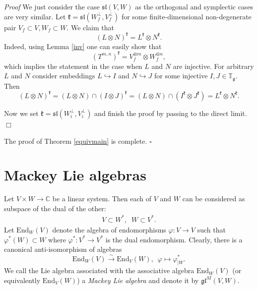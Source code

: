 \documentclass[10pt]{amsart}
\renewenvironment{proof}{ \emph{Proof}}{$\Box$}
\newcommand {\CC} {\mathbb {C}}
\newcommand{\TT}{\mathbb{T}}
\renewcommand{\sl}{\mathfrak{sl}}
\newcommand{\kk}{\mathfrak{k}}
\renewcommand{\gg}{\mathfrak{g}}
\renewcommand {\phi} {\varphi}
\newcommand{\gl}{\mathfrak{gl}}
\newcommand{\End}{\mathrm{End}}
\begin{document}
\begin{proof} We just consider the case $\sl(V,W)$ as the  orthogonal and symplectic cases are very similar.
Let $\kk=\sl(W_f^\perp,V_f^\perp)$ for some finite-dimensional
non-degenerate pair 
$V_f \subset V ,W_f \subset W$. We claim that 
$$(L\otimes N)^{\kk}=L^\kk\otimes N^\kk.$$
Indeed, using Lemma \ref{inv} one can easily show that 
$$(T^{m,n})^{\kk}=V_f^{\otimes m}\otimes W_f^{\otimes n},$$
which implies the statement in the case when $L$ and $N$ are injective.
For arbitrary $L$ and $N$ consider embeddings $L\hookrightarrow I$ and $N\hookrightarrow J$
for some injective $I,J\in\TT_\gg$. Then
$$(L\otimes N)^\kk=(L\otimes N)\cap (I\otimes J)^\kk=(L\otimes N)\cap (I^\kk\otimes J^\kk)=L^\kk\otimes N^\kk.$$

Now we set $\kk=\sl(W_i^{\perp},V_i^{\perp})$ and finish the proof by passing to the direct limit.
\end{proof}

\vspace{0.5cm}

The proof of Theorem \ref{equivmain} is complete. $\square$





\section{Mackey Lie algebras}\label{sect:6}
Let $V \times W \rightarrow \CC$ be a linear system.
Then each of $V$ and $W$ can be considered as subspace of 
the dual of the other:
\begin{eqnarray}
 V \subset W^*, \;\;W \subset V^*. \nonumber
\end{eqnarray}
Let $\End_W(V)$ denote the algebra of endomorphisms $\phi: V \rightarrow V$ such that $\phi^*(W) \subset W$ where $\phi^*: V^* \rightarrow V^*$ is the dual 
endomorphism. Clearly, there is a canonical anti-isomorphism of algebras
\begin{equation}\label{rel:canonic}
 \End_W(V) \stackrel{\sim}{\rightarrow} \End_V(W), \,\,\, \phi \longmapsto \phi^*_{|W}.
\end{equation}
We call the Lie algebra associated with the associative algebra $\End_W(V)$ (or equivalently  $\End_V(W)$) a \textit{Mackey Lie algebra} and denote it by 
$\gl^M(V,W)$.
\end{document}

